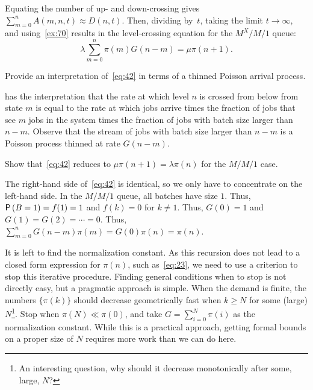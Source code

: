 Equating the number of up- and down-crossing gives $\sum_{m=0}^n A(m,n,t) \approx D(n,t)$. 
Then, dividing by~$t$, taking the limit $t\to\infty$, and using~\cref{ex:70} results in the level-crossing equation for the $M^X/M/1$ queue:
\begin{equation}\label{eq:42}
\lambda \sum_{m=0}^n \pi(m) G(n-m) = \mu \pi(n+1).
\end{equation}

\begin{exercise}
Provide an interpretation of~\cref{eq:42} in terms of a thinned Poisson arrival process.
\begin{solution}
  has the interpretation that the rate at which level $n$ is crossed from below from state $m$ is equal to the rate at which jobs arrive times the fraction of jobs that see $m$ jobs in the system times the fraction of jobs with batch size larger than $n-m$.
 Observe that the stream of jobs with batch size larger than $n-m$ is a Poisson process thinned at rate $G(n-m)$.
\end{solution}
\end{exercise}


\begin{extra}
 Show that~\cref{eq:42} reduces to $\mu \pi(n+1)=\lambda \pi(n)$ for the $M/M/1$ case.
\begin{solution}
 The right-hand side of~\cref{eq:42} is identical, so we only have to concentrate on the left-hand side.
 In the $M/M/1$ queue, all batches have size $1$.
 Thus, $\P{B=1} = f(1)=1$ and $f(k)=0$ for $k\neq 1$.
 Thus, $G(0)=1$ and $G(1)=G(2)=\cdots = 0$.
 Thus, $\sum_{m=0}^n G(n-m) \pi(m) = G(0)\pi(n)=\pi(n)$.
\end{solution}
\end{extra}



It is left to find the normalization constant.
As this recursion does not lead to a closed form expression for $\pi(n)$, such as~\cref{eq:23}, we need to use a criterion to stop this iterative procedure.
Finding general conditions when to stop is not directly easy, but a pragmatic approach is simple.
When the demand is finite, the numbers $\{\pi(k)\}$ should decrease geometrically fast when $k\geq N$ for some (large) $N$\footnote{An interesting question, why should it decrease monotonically after some, large, $N$?}.
Stop when $\pi(N)\ll \pi(0)$, and take $G=\sum_{i=0}^N \pi(i)$ as the normalization constant.
While this is a practical approach, getting formal bounds on a proper size of $N$ requires more work than we can do here.

